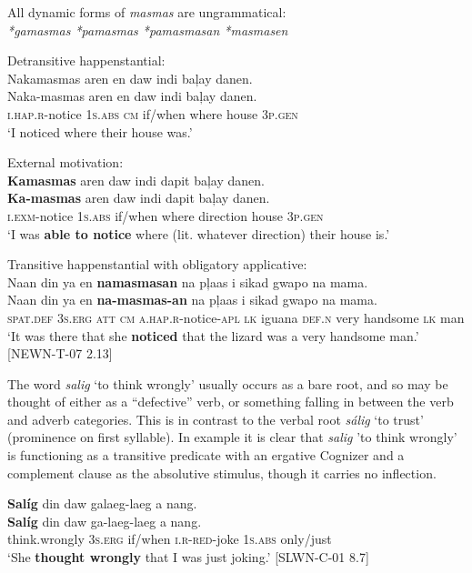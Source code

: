 \ea
All dynamic forms of \textit{masmas} are ungrammatical: \\
\textit{*gamasmas *pamasmas  *pamasmasan  *masmasen}
\z

\ea
Detransitive happenstantial: \\
Nakamasmas	aren	en	daw	indi	baļay	danen. \\\smallskip
\gll Naka-masmas	aren	en	daw	indi	baļay	danen. \\
\textsc{i.hap.r}-notice	1\textsc{s.abs}	\textsc{cm}	if/when	where	house	3\textsc{p.gen} \\
\glt `I noticed where their house was.'
\z

\ea
External motivation: \\
\textbf{Kamasmas}  aren  daw  indi  dapit  baļay  danen. \\\smallskip
\gll \textbf{Ka-masmas}  aren  daw  indi  dapit  baļay  danen. \\
\textsc{i.exm}-notice  1\textsc{s.abs}  if/when  where  direction  house  3\textsc{p.gen} \\
\glt ‘I was \textbf{able to notice} where (lit. whatever direction) their house is.’
\z

\ea
Transitive happenstantial with obligatory applicative: \\
Naan  din  ya  en  \textbf{namasmasan}   na  pļaas  i  sikad  gwapo na  mama. \\\smallskip
\gll Naan  din  ya  en  \textbf{na-masmas-an}   na  pļaas  i  sikad  gwapo na  mama. \\
\textsc{spat.def}  3\textsc{s.erg}  \textsc{att}  \textsc{cm}  \textsc{a.hap.r}-notice-\textsc{apl}  \textsc{lk}  iguana  \textsc{def.n}  very  handsome
\textsc{lk}  man \\
\glt `It was there that she \textbf{noticed} that the lizard was a very handsome man.’ [NEWN-T-07 2.13]
\z

The word \textit{salig} ‘to think wrongly’ usually occurs as a bare root, and so may be thought of either as a “defective” verb, or something falling in between the verb and adverb categories. This is in contrast to the verbal root \textit{sálig} ‘to trust’ (prominence on first syllable). In example  it is clear that \textit{salig} 'to think wrongly' is functioning as a transitive predicate with an ergative Cognizer and a complement clause as the absolutive stimulus, though it carries no inflection. 

\ea
\label{bkm:Ref123650588}
\textbf{Salíg}   din  daw  galaeg-laeg  a  nang. \\\smallskip
\gll \textbf{Salíg}   din  daw  ga-laeg-laeg  a  nang. \\
think.wrongly  3\textsc{s.erg}  if/when  \textsc{i.r}-\textsc{red}-joke  1\textsc{s.abs}  only/just \\
\glt ‘She \textbf{thought wrongly} that I was just joking.’ [SLWN-C-01 8.7]
\z

